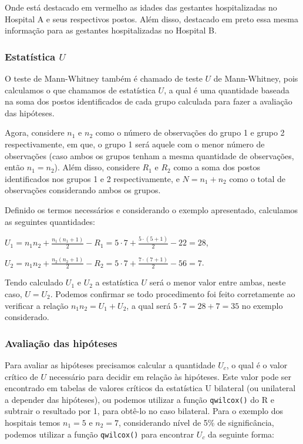 \documentclass[
  letterpaper,
  DIV=11,
  numbers=noendperiod]{scrreprt}
\begin{document}
Onde está destacado em vermelho as idades das gestantes hospitalizadas
no Hospital A e seus respectivos postos. Além disso, destacado em preto
essa mesma informação para as gestantes hospitalizadas no Hospital B.

\hypertarget{estatuxedstica-u}{%
\subsubsection{\texorpdfstring{Estatística
\(U\)}{Estatística U}}\label{estatuxedstica-u}}

O teste de Mann-Whitney também é chamado de teste \(U\) de Mann-Whitney,
pois calculamos o que chamamos de estatística \(U\), a qual é uma
quantidade baseada na soma dos postos identificados de cada grupo
calculada para fazer a avaliação das hipóteses.

Agora, considere \(n_1\) e \(n_2\) como o número de observações do grupo
1 e grupo 2 respectivamente, em que, o grupo 1 será aquele com o menor
número de observações (caso ambos os grupos tenham a mesma quantidade de
observações, então \(n_1 = n_2\)). Além disso, considere \(R_1\) e
\(R_2\) como a soma dos postos identificados nos grupos 1 e 2
respectivamente, e \(N = n_1 + n_2\) como o total de observações
considerando ambos os grupos.

Definido os termos necessários e considerando o exemplo apresentado,
calculamos as seguintes quantidades:

\(U_1=n_1n_2+\displaystyle \frac{n_1\left(n_1+1\right)}{2}-R_1=5\cdot7+\displaystyle \frac{5 \cdot\left(5+1\right)}{2}-22 = 28\),

\(U_2=n_1 n_2+\displaystyle \frac{n_2\left(n_2+1\right)}{2}-R_2=5 \cdot 7+\displaystyle \frac{7 \cdot\left(7+1\right)}{2}-56 = 7\).

Tendo calculado \(U_1\) e \(U_2\) a estatística \(U\) será o menor valor
entre ambas, neste caso, \(U = U_2\). Podemos confirmar se todo
procedimento foi feito corretamente ao verificar a relação
\(n_1n_2 = U_1 + U_2\), a qual será \(5\cdot 7 = 28 + 7 = 35\) no
exemplo considerado.

\hypertarget{avaliauxe7uxe3o-das-hipuxf3teses}{%
\subsubsection{Avaliação das
hipóteses}\label{avaliauxe7uxe3o-das-hipuxf3teses}}

Para avaliar as hipóteses precisamos calcular a quantidade \(U_c\), o
qual é o valor crítico de \(U\) necessário para decidir em relação às
hipóteses. Este valor pode ser encontrado em tabelas de valores críticos
da estatística U bilateral (ou unilateral a depender das hipóteses), ou
podemos utilizar a função \texttt{qwilcox()} do R e subtrair o resultado
por 1, para obtê-lo no caso bilateral. Para o exemplo dos hospitais
temos \(n_1 = 5\) e \(n_2 = 7\), considerando nível de 5\% de
significância, podemos utilizar a função \texttt{qwilcox()} para
encontrar \(U_c\) da seguinte forma:
\end{document}

